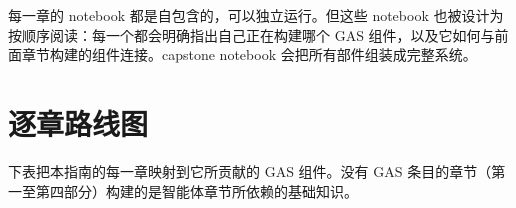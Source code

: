 \documentclass[11pt,a4paper,openany]{book}
\begin{document}
\begin{warningbox}[增量构建]
每一章的 notebook 都是自包含的，可以独立运行。但这些 notebook 也被设计为按顺序阅读：每一个都会明确指出自己正在构建哪个 GAS 组件，以及它如何与前面章节构建的组件连接。capstone notebook 会把所有部件组装成完整系统。
\end{warningbox}

\section*{逐章路线图}
\label{gas-roadmap}

下表把本指南的每一章映射到它所贡献的 GAS 组件。没有 GAS 条目的章节（第一至第四部分）构建的是智能体章节所依赖的基础知识。
\end{document}
